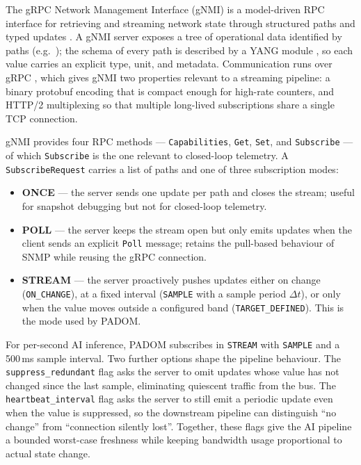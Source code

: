 \documentclass[12pt, a4paper, reqno, oneside]{book}
\newcommand{\padonap}{\textsc{PADOM}}
\begin{document}
The gRPC Network Management Interface (gNMI) is a model-driven RPC interface
for retrieving and streaming network state through structured paths and typed
updates \cite{gnmi_spec}. A gNMI server exposes a tree of operational data
identified by paths (e.g.\
); the schema
of every path is described by a YANG module
\cite{yang_rfc7950}, so each value carries an explicit type, unit, and
metadata. Communication runs over gRPC \cite{grpc_docs}, which gives gNMI two
properties relevant to a streaming pipeline: a binary protobuf encoding that
is compact enough for high-rate counters, and HTTP/2 multiplexing so that
multiple long-lived subscriptions share a single TCP connection.

gNMI provides four RPC methods --- \texttt{Capabilities}, \texttt{Get},
\texttt{Set}, and \texttt{Subscribe} --- of which \texttt{Subscribe} is the
one relevant to closed-loop telemetry. A \texttt{SubscribeRequest} carries a
list of paths and one of three subscription modes:

\begin{itemize}
    \item \textbf{ONCE} --- the server sends one update per path and closes
          the stream; useful for snapshot debugging but not for closed-loop
          telemetry.
    \item \textbf{POLL} --- the server keeps the stream open but only emits
          updates when the client sends an explicit \texttt{Poll} message;
          retains the pull-based behaviour of SNMP while reusing the gRPC
          connection.
    \item \textbf{STREAM} --- the server proactively pushes updates either
          on change (\texttt{ON\_CHANGE}), at a fixed interval
          (\texttt{SAMPLE} with a sample period $\Delta t$), or only when
          the value moves outside a configured band
          (\texttt{TARGET\_DEFINED}). This is the mode used by \padonap{}.
\end{itemize}

For per-second AI inference, \padonap{} subscribes in \texttt{STREAM} with
\texttt{SAMPLE} and a 500\,ms sample interval. Two further options shape the
pipeline behaviour. The \texttt{suppress\_redundant} flag asks the server to
omit updates whose value has not changed since the last sample, eliminating
quiescent traffic from the bus. The \texttt{heartbeat\_interval} flag asks
the server to still emit a periodic update even when the value is suppressed,
so the downstream pipeline can distinguish ``no change'' from ``connection
silently lost''. Together, these flags give the AI pipeline a bounded
worst-case freshness while keeping bandwidth usage proportional to actual
state change.
\end{document}

